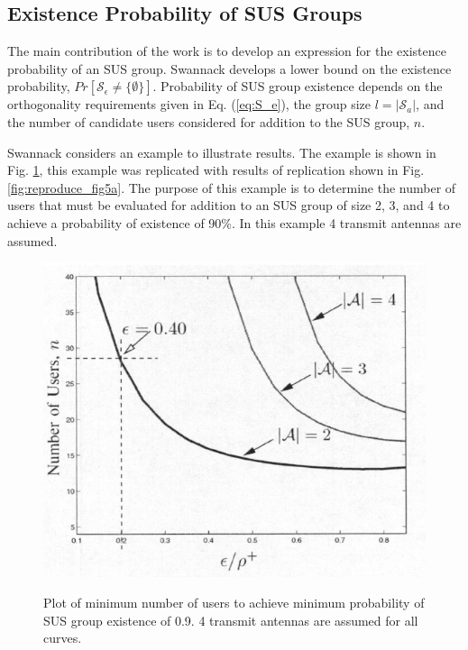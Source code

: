 \subsection{Existence Probability of SUS Groups}
The main contribution of the work is to develop an expression for the existence probability of an SUS group. Swannack develops a lower bound on the existence probability, $Pr[\mathcal{S}_\epsilon \neq \lbrace \emptyset \rbrace]$. Probability of SUS group existence depends on the orthogonality requirements given in Eq. (\ref{eq:S_e}), the group size $l = \vert \mathcal{S}_a \vert$, and the number of candidate users considered for addition to the SUS group, $n$. 

Swannack considers an example to illustrate results. The example is shown in Fig. \ref{fig:swannack_fig5a}, this example was replicated with results of replication shown in Fig. \ref{fig:reproduce_fig5a}. The purpose of this example is to determine the number of users that must be evaluated for addition to an SUS group of size 2, 3, and 4 to achieve a probability of existence of 90\%. In this example 4 transmit antennas are assumed.

\begin{figure}
    \includegraphics[width=12cm]{figs/swannack_fig5a.png}\\
    \caption{Plot of minimum number of users to achieve minimum probability of SUS group existence of 0.9. 4 transmit antennas are assumed for all curves.}
    \label{fig:swannack_fig5a}
\end{figure}

